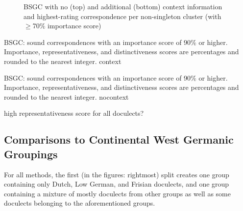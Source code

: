 \documentclass[a4paper]{article}
\begin{document}
\begin{figure}[h]
  \centering
%   
  

  \vspace{2em}
  
%   
  
  \caption{BSGC with no (top) and additional (bottom) context information and highest-rating correspondence per non-singleton cluster (with $\geq$70\% importance score)}
  \label{fig:bsgc-trees}
\end{figure}


\begin{table}[h]
\centering

\caption{BSGC: sound correspondences with an importance score of 90\% or higher.
Importance, representativeness, and distinctiveness scores are percentages and rounded to the nearest integer.
context}
\label{tab:bsgc-context-corres}
\end{table}

\begin{table}[h]
\centering

\caption{BSGC: sound correspondences with an importance score of 90\% or higher.
Importance, representativeness, and distinctiveness scores are percentages and rounded to the nearest integer.
nocontext}
\label{tab:bsgc-nocontext-corres}
\end{table}

high representativeness score for all doculects?

\subsection{Comparisons to Continental West Germanic Groupings}

For all methods, the first (in the figures: rightmost) split
creates one group containing only Dutch, Low German, and Frisian doculects,
and one group containing a mixture of mostly doculects from other groups
as well as some doculects belonging to the aforementioned groups.

\end{document}

